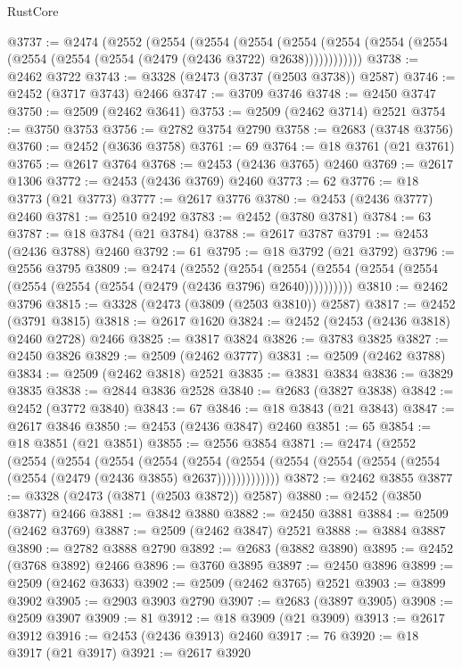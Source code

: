 \begin{lexlean}{RustCore}
\begin{coremodule}
@3737 := @2474
    (@2552
      (@2554
        (@2554
          (@2554
            (@2554 (@2554 (@2554 (@2554 (@2554 (@2554 (@2554 (@2479 (@2436 @3722) @2638))))))))))))
@3738 := @2462 @3722
@3743 := @3328 (@2473 (@3737 (@2503 @3738)) @2587)
@3746 := @2452 (@3717 @3743) @2466
@3747 := @3709 @3746
@3748 := @2450 @3747
@3750 := @2509 (@2462 @3641)
@3753 := @2509 (@2462 @3714) @2521
@3754 := @3750 @3753
@3756 := @2782 @3754 @2790
@3758 := @2683 (@3748 @3756)
@3760 := @2452 (@3636 @3758)
@3761 := 69
@3764 := @18 @3761 (@21 @3761)
@3765 := @2617 @3764
@3768 := @2453 (@2436 @3765) @2460
@3769 := @2617 @1306
@3772 := @2453 (@2436 @3769) @2460
@3773 := 62
@3776 := @18 @3773 (@21 @3773)
@3777 := @2617 @3776
@3780 := @2453 (@2436 @3777) @2460
@3781 := @2510 @2492
@3783 := @2452 (@3780 @3781)
@3784 := 63
@3787 := @18 @3784 (@21 @3784)
@3788 := @2617 @3787
@3791 := @2453 (@2436 @3788) @2460
@3792 := 61
@3795 := @18 @3792 (@21 @3792)
@3796 := @2556 @3795
@3809 := @2474
    (@2552
      (@2554 (@2554 (@2554 (@2554 (@2554 (@2554 (@2554 (@2554 (@2479 (@2436 @3796) @2640))))))))))
@3810 := @2462 @3796
@3815 := @3328 (@2473 (@3809 (@2503 @3810)) @2587)
@3817 := @2452 (@3791 @3815)
@3818 := @2617 @1620
@3824 := @2452 (@2453 (@2436 @3818) @2460 @2728) @2466
@3825 := @3817 @3824
@3826 := @3783 @3825
@3827 := @2450 @3826
@3829 := @2509 (@2462 @3777)
@3831 := @2509 (@2462 @3788)
@3834 := @2509 (@2462 @3818) @2521
@3835 := @3831 @3834
@3836 := @3829 @3835
@3838 := @2844 @3836 @2528
@3840 := @2683 (@3827 @3838)
@3842 := @2452 (@3772 @3840)
@3843 := 67
@3846 := @18 @3843 (@21 @3843)
@3847 := @2617 @3846
@3850 := @2453 (@2436 @3847) @2460
@3851 := 65
@3854 := @18 @3851 (@21 @3851)
@3855 := @2556 @3854
@3871 := @2474
    (@2552
      (@2554
        (@2554
          (@2554
            (@2554
              (@2554
                (@2554 (@2554 (@2554 (@2554 (@2554 (@2554 (@2479 (@2436 @3855) @2637)))))))))))))
@3872 := @2462 @3855
@3877 := @3328 (@2473 (@3871 (@2503 @3872)) @2587)
@3880 := @2452 (@3850 @3877) @2466
@3881 := @3842 @3880
@3882 := @2450 @3881
@3884 := @2509 (@2462 @3769)
@3887 := @2509 (@2462 @3847) @2521
@3888 := @3884 @3887
@3890 := @2782 @3888 @2790
@3892 := @2683 (@3882 @3890)
@3895 := @2452 (@3768 @3892) @2466
@3896 := @3760 @3895
@3897 := @2450 @3896
@3899 := @2509 (@2462 @3633)
@3902 := @2509 (@2462 @3765) @2521
@3903 := @3899 @3902
@3905 := @2903 @3903 @2790
@3907 := @2683 (@3897 @3905)
@3908 := @2509 @3907
@3909 := 81
@3912 := @18 @3909 (@21 @3909)
@3913 := @2617 @3912
@3916 := @2453 (@2436 @3913) @2460
@3917 := 76
@3920 := @18 @3917 (@21 @3917)
@3921 := @2617 @3920

\end{coremodule}
\end{lexlean}
